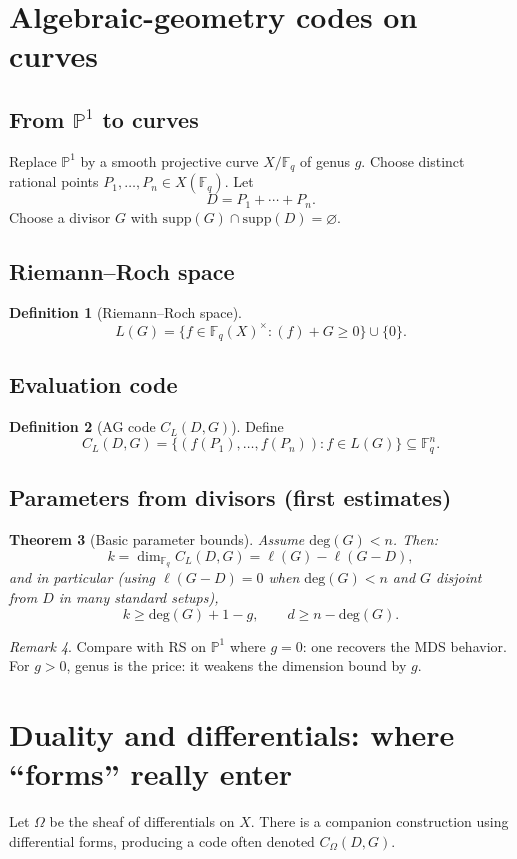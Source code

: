 \documentclass[11pt]{article}
\newtheorem{theorem}{Theorem}[section]
\theoremstyle{definition}
\newtheorem{definition}[theorem]{Definition}
\theoremstyle{remark}
\newtheorem{remark}[theorem]{Remark}
\newcommand{\F}{\mathbb{F}}
\newcommand{\PP}{\mathbb{P}}
\newcommand{\supp}{\mathrm{supp}}
\newcommand{\degdiv}{\mathrm{deg}}
\begin{document}
	\section{Algebraic-geometry codes on curves}
	\subsection{From \(\PP^1\) to curves}
	Replace \(\PP^1\) by a smooth projective curve \(X/\F_q\) of genus \(g\).
	Choose distinct rational points \(P_1,\dots,P_n \in X(\F_q)\). Let
	\[
	D=P_1+\cdots+P_n.
	\]
	Choose a divisor \(G\) with \(\supp(G)\cap \supp(D)=\varnothing\).
	
	\subsection{Riemann--Roch space}
	\begin{definition}[Riemann--Roch space]
		\[
		L(G)=\{f\in \F_q(X)^\times : (f)+G\ge 0\}\cup\{0\}.
		\]
	\end{definition}
	
	\subsection{Evaluation code}
	\begin{definition}[AG code \(C_L(D,G)\)]
		Define
		\[
		C_L(D,G)=\{(f(P_1),\dots,f(P_n)) : f\in L(G)\}\subseteq \F_q^n.
		\]
	\end{definition}
	
	\subsection{Parameters from divisors (first estimates)}
	\begin{theorem}[Basic parameter bounds]
		Assume \(\degdiv(G)<n\). Then:
		\[
		k=\dim_{\F_q} C_L(D,G)=\ell(G)-\ell(G-D),
		\]
		and in particular (using \(\ell(G-D)=0\) when \(\degdiv(G)<n\) and \(G\) disjoint from \(D\) in many standard setups),
		\[
		k\ge \degdiv(G)+1-g,
		\qquad
		d \ge n-\degdiv(G).
		\]
	\end{theorem}
	
	\begin{remark}
		Compare with RS on \(\PP^1\) where \(g=0\): one recovers the MDS behavior.
		For \(g>0\), genus is the price: it weakens the dimension bound by \(g\).
	\end{remark}
	
	\section{Duality and differentials: where ``forms'' really enter}
	Let \(\Omega\) be the sheaf of differentials on \(X\).
	There is a companion construction using differential forms, producing a code often denoted \(C_\Omega(D,G)\).
	
\end{document}
